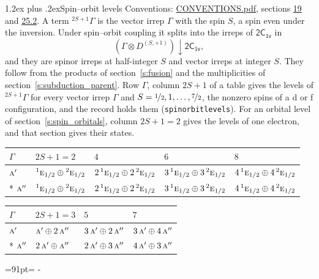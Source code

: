 \documentclass[10pt,a4paper]{article}
\makeatletter
\renewcommand\section{\@startsection{section}{1}{\z@}{-3ex plus -1ex minus -.2ex}%
  {1.2ex plus .2ex}{\normalfont\large\sffamily\bfseries\color{parttitle}}}
\newcommand{\needspace}[1]{\par\penalty-100\begingroup\dimen0=#1\relax\dimen2=\pagegoal
  \advance\dimen2-\pagetotal\ifdim\dimen0>\dimen2\relax\ifdim\dimen2>0pt\vfil\break\fi\fi
  \endgroup}
\numberwithin{equation}{section}
\newcommand{\grp}[1]{\mathsf{#1}}
\newcommand{\irr}[1]{\text{\normalfont\scshape #1}}
\newcommand{\conjpair}[1]{{}^{#1}}
\newcommand{\restr}[2]{#1\!\downarrow#2}
\newcommand{\irrJp}[2]{D^{(#1,#2)}}
\newcommand{\irrprod}{\otimes}
\newcommand{\term}[2]{{}^{#1}#2}
\makeatother
\begin{document}
\section{Spin--orbit levels}\label{s:spin_orbit}
Conventions: \href{../../CONVENTIONS.pdf}{CONVENTIONS.pdf}, sections \href{../../../rotation/CONVENTIONS.pdf\#conv.19}{19} and \href{../../CONVENTIONS.pdf\#conv.25.2}{25.2}.
\leavevmode\label{n:local.spin}\label{n:symbol.term}A term $\term{2S+1}{\Gamma}$ is the vector irrep $\Gamma$ with the spin $S$, a spin even under the inversion. Under spin--orbit coupling it splits into the irreps of $\grp{2C_{1v}}$ in
\begin{equation}\label{e:spinorbit}\restr{(\Gamma \irrprod \irrJp{S}{+1})}{\grp{2C_{1v}}},\end{equation}
and they are spinor irreps at half-integer $S$ and vector irreps at integer $S$. They follow from the products of section~\ref{s:fusion} and the multiplicities of section~\ref{s:subduction_parent}. Row $\Gamma$, column $2S + 1$ of a table gives the levels of $\term{2S+1}{\Gamma}$ for every vector irrep $\Gamma$ and $S = \nicefrac{1}{2}, 1, \dots, \nicefrac{7}{2}$, the nonzero spins of a d or f configuration, and the record holds them (\texttt{spinorbitlevels}). For an orbital level of section~\ref{s:spin_orbitals}, column $2S + 1 = 2$ gives the levels of one electron, and that section gives their states.
{\small\setlength{\tabcolsep}{3pt}\begin{longtable}{@{}lllll@{}}\toprule
$\Gamma$ & $2S + 1 = 2$ & $4$ & $6$ & $8$\\\midrule\endhead
\bottomrule\endfoot\endlastfoot
$\irr{a}'$ & $\conjpair{1}\irr{e}_{1/2}\oplus \conjpair{2}\irr{e}_{1/2}$ & $2\,\conjpair{1}\irr{e}_{1/2}\oplus 2\,\conjpair{2}\irr{e}_{1/2}$ & $3\,\conjpair{1}\irr{e}_{1/2}\oplus 3\,\conjpair{2}\irr{e}_{1/2}$ & $4\,\conjpair{1}\irr{e}_{1/2}\oplus 4\,\conjpair{2}\irr{e}_{1/2}$\\*
$\irr{a}''$ & $\conjpair{1}\irr{e}_{1/2}\oplus \conjpair{2}\irr{e}_{1/2}$ & $2\,\conjpair{1}\irr{e}_{1/2}\oplus 2\,\conjpair{2}\irr{e}_{1/2}$ & $3\,\conjpair{1}\irr{e}_{1/2}\oplus 3\,\conjpair{2}\irr{e}_{1/2}$ & $4\,\conjpair{1}\irr{e}_{1/2}\oplus 4\,\conjpair{2}\irr{e}_{1/2}$\\
\bottomrule\end{longtable}}
{\small\setlength{\tabcolsep}{3pt}\begin{longtable}{@{}llll@{}}\toprule
$\Gamma$ & $2S + 1 = 3$ & $5$ & $7$\\\midrule\endhead
\bottomrule\endfoot\endlastfoot
$\irr{a}'$ & $\irr{a}'\oplus 2\,\irr{a}''$ & $3\,\irr{a}'\oplus 2\,\irr{a}''$ & $3\,\irr{a}'\oplus 4\,\irr{a}''$\\*
$\irr{a}''$ & $2\,\irr{a}'\oplus \irr{a}''$ & $2\,\irr{a}'\oplus 3\,\irr{a}''$ & $4\,\irr{a}'\oplus 3\,\irr{a}''$\\
\bottomrule\end{longtable}}
\needspace{91pt}
\end{document}
